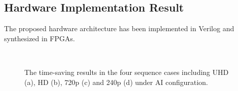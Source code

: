 \documentclass[lettersize,journal]{IEEEtran}
\begin{document}
\subsection{Hardware Implementation Result}
The proposed hardware architecture has been implemented in Verilog and synthesized in FPGAs.

\begin{figure}[htbp]
	\centering
	 \hspace{2pt}
	 \vspace{-5pt} \\
	 \hspace{2pt}
	\caption{The time-saving results in the four sequence cases including UHD (a), HD (b), 720p (c) and 240p (d) under AI configuration.}
	\label{Time curves}
\end{figure}
\end{document}
